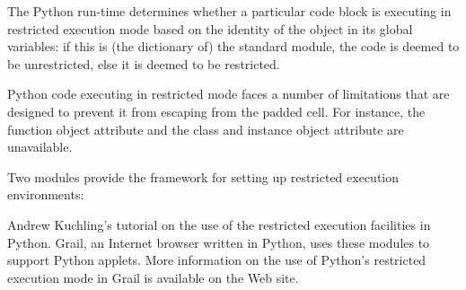 The Python run-time determines whether a particular code block is
executing in restricted execution mode based on the identity of the
 object in its global variables: if this is (the
dictionary of) the standard  module,
the code is deemed to be unrestricted, else it is deemed to be
restricted.

Python code executing in restricted mode faces a number of limitations
that are designed to prevent it from escaping from the padded cell.
For instance, the function object attribute  and
the class and instance object attribute  are
unavailable.

Two modules provide the framework for setting up restricted execution
environments:

\localmoduletable

\begin{seealso}
           {Andrew Kuchling's tutorial on the use of the restricted
            execution facilities in Python.}
           {Grail, an Internet browser written in Python, uses these
            modules to support Python applets.  More
            information on the use of Python's restricted execution
            mode in Grail is available on the Web site.}
\end{seealso}
